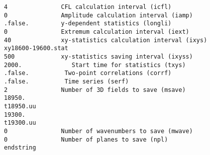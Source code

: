 \begin{verbatim}
4               CFL calculation interval (icfl)
0               Amplitude calculation interval (iamp)
.false.         y-dependent statistics (longli)
0               Extremum calculation interval (iext)
40              xy-statistics calculation interval (ixys)
xy18600-19600.stat
500             xy-statistics saving interval (ixyss)
2000.              Start time for statistics (txys)
.false.          Two-point correlations (corrf)
.false.          Time series (serf)
2               Number of 3D fields to save (msave)
18950.
t18950.uu
19300.
t19300.uu
0               Number of wavenumbers to save (mwave)
0               Number of planes to save (npl)
endstring
\end{verbatim}
